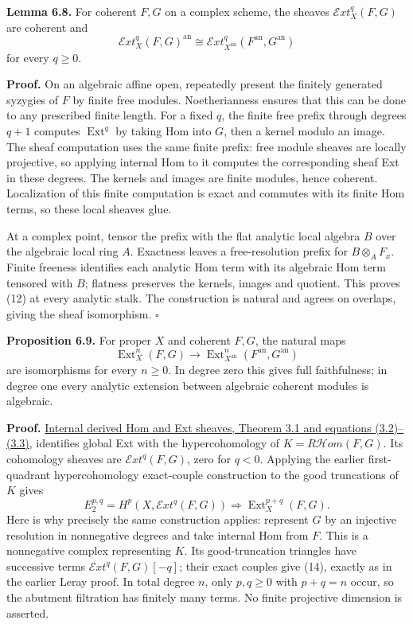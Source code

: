 \documentclass[11pt]{article}
\begin{document}
\textbf{Lemma 6.8.} For coherent \(F,G\) on a complex scheme, the
sheaves \(\mathcal Ext^q_X(F,G)\) are coherent and \[
\mathcal Ext^q_X(F,G)^{\mathrm{an}}
\cong\mathcal Ext^q_{X^{\mathrm{an}}}(F^{\mathrm{an}},G^{\mathrm{an}})
\tag{12}
\] for every \(q\ge0\).

\textbf{Proof.} On an algebraic affine open, repeatedly present the
finitely generated syzygies of \(F\) by finite free modules.
Noetherianness ensures that this can be done to any prescribed finite
length. For a fixed \(q\), the finite free prefix through degrees
\(q+1\) computes \(\operatorname{Ext}^q\) by taking Hom into \(G\), then
a kernel modulo an image. The sheaf computation uses the same finite
prefix: free module sheaves are locally projective, so applying internal
Hom to it computes the corresponding sheaf Ext in these degrees. The
kernels and images are finite modules, hence coherent. Localization of
this finite computation is exact and commutes with its finite Hom terms,
so these local sheaves glue.

At a complex point, tensor the prefix with the flat analytic local
algebra \(B\) over the algebraic local ring \(A\). Exactness leaves a
free-resolution prefix for \(B\otimes_A F_x\). Finite freeness
identifies each analytic Hom term with its algebraic Hom term tensored
with \(B\); flatness preserves the kernels, images and quotient. This
proves (12) at every analytic stalk. The construction is natural and
agrees on overlaps, giving the sheaf isomorphism. \(\square\)

\textbf{Proposition 6.9.} For proper \(X\) and coherent \(F,G\), the
natural maps \[
\operatorname{Ext}^n_X(F,G)\longrightarrow
\operatorname{Ext}^n_{X^{\mathrm{an}}}(F^{\mathrm{an}},G^{\mathrm{an}})
\tag{13}
\] are isomorphisms for every \(n\ge0\). In degree zero this gives full
faithfulness; in degree one every analytic extension between algebraic
coherent modules is algebraic.

\textbf{Proof.}
\href{../derived-categories-and-sheaf-operations/internal-derived-hom-and-ext-sheaves.html\#3-adjunction-local-maps-and-ext}{Internal
derived Hom and Ext sheaves, Theorem 3.1 and equations (3.2)--(3.3)},
identifies global Ext with the hypercohomology of
\(K=R\mathcal Hom(F,G)\). Its cohomology sheaves are
\(\mathcal Ext^q(F,G)\), zero for \(q<0\). Applying the earlier
first-quadrant hypercohomology exact-couple construction to the good
truncations of \(K\) gives \[
E_2^{p,q}=H^p(X,\mathcal Ext^q(F,G))
\Longrightarrow\operatorname{Ext}^{p+q}_X(F,G).
\tag{14}
\] Here is why precisely the same construction applies: represent \(G\)
by an injective resolution in nonnegative degrees and take internal Hom
from \(F\). This is a nonnegative complex representing \(K\). Its
good-truncation triangles have successive terms
\(\mathcal Ext^q(F,G)[-q]\); their exact couples give (14), exactly as
in the earlier Leray proof. In total degree \(n\), only \(p,q\ge0\) with
\(p+q=n\) occur, so the abutment filtration has finitely many terms. No
finite projective dimension is asserted.
\end{document}

